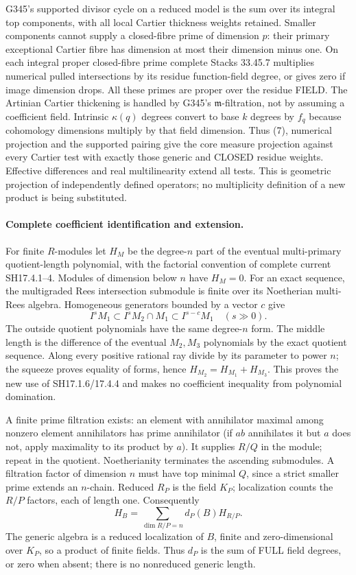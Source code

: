 G345's supported divisor cycle on a reduced model is the sum over its integral top components, with all local Cartier thickness weights retained. Smaller components cannot supply a closed-fibre prime of dimension $p$: their primary exceptional Cartier fibre has dimension at most their dimension minus one. On each integral proper closed-fibre prime complete Stacks 33.45.7 multiplies numerical pulled intersections by its residue function-field degree, or gives zero if image dimension drops. All these primes are proper over the residue FIELD. The Artinian Cartier thickening is handled by G345's $\mathfrak m$-filtration, not by assuming a coefficient field. Intrinsic $\kappa(q)$ degrees convert to base $k$ degrees by $f_q$ because cohomology dimensions multiply by that field dimension. Thus (7), numerical projection and the supported pairing give the core measure projection against every Cartier test with exactly those generic and CLOSED residue weights. Effective differences and real multilinearity extend all tests. This is geometric projection of independently defined operators; no multiplicity definition of a new product is being substituted.

\paragraph{Complete coefficient identification and extension.}
For finite $R$-modules let $H_M$ be the degree-$n$ part of the eventual multi-primary quotient-length polynomial, with the factorial convention of complete current SH17.4.1--4. Modules of dimension below $n$ have $H_M=0$. For an exact sequence, the multigraded Rees intersection submodule is finite over its Noetherian multi-Rees algebra. Homogeneous generators bounded by a vector $c$ give
\[
 I^sM_1\subset I^sM_2\cap M_1\subset I^{s-c}M_1\quad(s\gg0).
\]
The outside quotient polynomials have the same degree-$n$ form. The middle length is the difference of the eventual $M_2,M_3$ polynomials by the exact quotient sequence. Along every positive rational ray divide by its parameter to power $n$; the squeeze proves equality of forms, hence $H_{M_2}=H_{M_1}+H_{M_3}$. This proves the new use of SH17.1.6/17.4.4 and makes no coefficient inequality from polynomial domination.

A finite prime filtration exists: an element with annihilator maximal among nonzero element annihilators has prime annihilator (if $ab$ annihilates it but $a$ does not, apply maximality to its product by $a$). It supplies $R/Q$ in the module; repeat in the quotient. Noetherianity terminates the ascending submodules. A filtration factor of dimension $n$ must have top minimal $Q$, since a strict smaller prime extends an $n$-chain. Reduced $R_P$ is the field $K_P$; localization counts the $R/P$ factors, each of length one. Consequently
\[
 H_B=\sum_{\dim R/P=n}d_P(B)H_{R/P}. \tag{8}
\]
The generic algebra is a reduced localization of $B$, finite and zero-dimensional over $K_P$, so a product of finite fields. Thus $d_P$ is the sum of FULL field degrees, or zero when absent; there is no nonreduced generic length.

